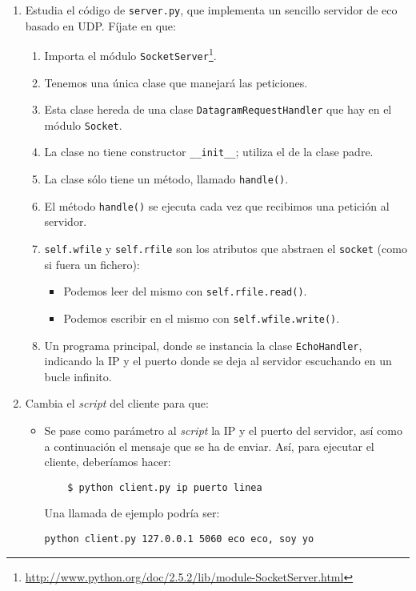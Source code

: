 \documentclass[11pt,a4paper]{article}
\begin{document}
\begin{enumerate}
  \item Estudia el código de \texttt{server.py}, que implementa un sencillo servidor de eco basado en UDP. Fíjate en que:
  \begin{enumerate}
    \item Importa el módulo \texttt{SocketServer}\footnote{\url{http://www.python.org/doc/2.5.2/lib/module-SocketServer.html}}.
    \item Tenemos una única clase que manejará las peticiones.
    \item Esta clase hereda de una clase \texttt{DatagramRequestHandler} que hay en el módulo \texttt{Socket}.
    \item La clase no tiene constructor \texttt{\_\_init\_\_}; utiliza el de la clase padre.
    \item La clase sólo tiene un método, llamado \texttt{handle()}.
    \item El método \texttt{handle()} se ejecuta cada vez que recibimos una petición al servidor.
    \item \texttt{self.wfile} y \texttt{self.rfile} son los atributos que abstraen el \texttt{socket} (como si fuera un fichero):
    \begin{itemize}
      \item Podemos leer del mismo con \texttt{self.rfile.read()}.
      \item Podemos escribir en el mismo con \texttt{self.wfile.write()}.
    \end{itemize}
    \item Un programa principal, donde se instancia la clase \texttt{EchoHandler}, indicando la IP y el puerto donde se deja al servidor escuchando en un bucle infinito.
  \end{enumerate}

  \item Cambia el \emph{script} del cliente para que:
  \begin{itemize}
    \item Se pase como parámetro al \emph{script} la IP y el puerto del servidor, así como a continuación el mensaje que se ha de enviar. Así, para ejecutar el cliente, deberíamos hacer:
    \begin{verbatim}
	$ python client.py ip puerto linea
    \end{verbatim}
  Una llamada de ejemplo podría ser: 
\begin{verbatim}
python client.py 127.0.0.1 5060 eco eco, soy yo
\end{verbatim}
  \end{itemize}


\end{enumerate}
\end{document}
